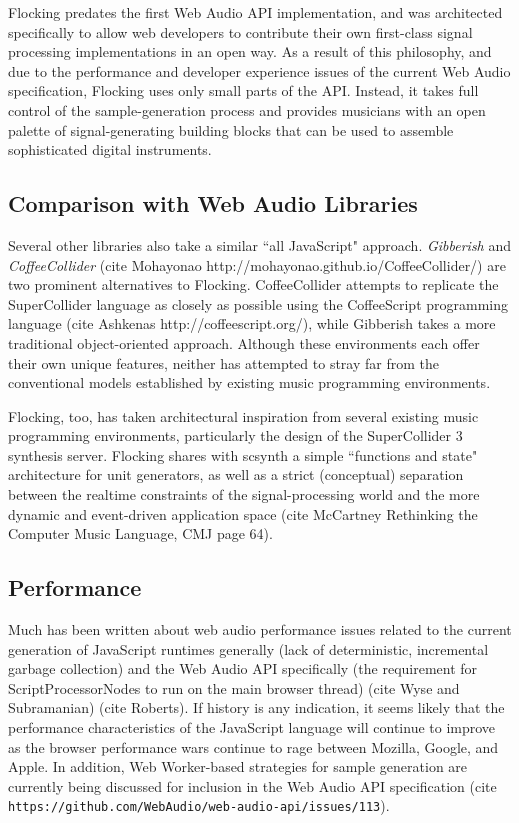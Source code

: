 \documentclass{article}
\begin{document}
Flocking predates the first Web Audio API implementation, and was architected specifically to allow web developers to contribute their own first-class signal processing implementations in an open way. As a result of this philosophy, and due to the performance and developer experience issues of the current Web Audio specification, Flocking uses only small parts of the API. Instead, it takes full control of the sample-generation process and provides musicians with an open palette of signal-generating building blocks that can be used to assemble sophisticated digital instruments.

\subsection{Comparison with Web Audio Libraries}

Several other libraries also take a similar ``all JavaScript" approach. {\it Gibberish} \cite{roberts_web_2013} and {\it CoffeeCollider} (cite Mohayonao http://mohayonao.github.io/CoffeeCollider/) are two prominent alternatives to Flocking. CoffeeCollider attempts to replicate the SuperCollider language as closely as possible using the CoffeeScript programming language (cite Ashkenas http://coffeescript.org/), while Gibberish takes a more traditional object-oriented approach. Although these environments each offer their own unique features, neither has attempted to stray far from the conventional models established by existing music programming environments.

Flocking, too, has taken architectural inspiration from several existing music programming environments, particularly the design of the SuperCollider 3 synthesis server. Flocking shares with scsynth a simple ``functions and state" architecture for unit generators, as well as a strict (conceptual) separation between the realtime constraints of the signal-processing world and the more dynamic and event-driven application space (cite McCartney Rethinking the Computer Music Language, CMJ page 64).

\subsection{Performance}

Much has been written about web audio performance issues related to the current generation of JavaScript runtimes generally (lack of deterministic, incremental garbage collection) and the Web Audio API specifically (the requirement for ScriptProcessorNodes to run on the main browser thread) (cite Wyse and Subramanian) (cite Roberts). If history is any indication, it seems likely that the performance characteristics of the JavaScript language will continue to improve as the browser performance wars continue to rage between Mozilla, Google, and Apple. In addition, Web Worker-based strategies for sample generation are currently being discussed for inclusion in the Web Audio API specification (cite \verb|https://github.com/WebAudio/web-audio-api/issues/113|).
\end{document}
